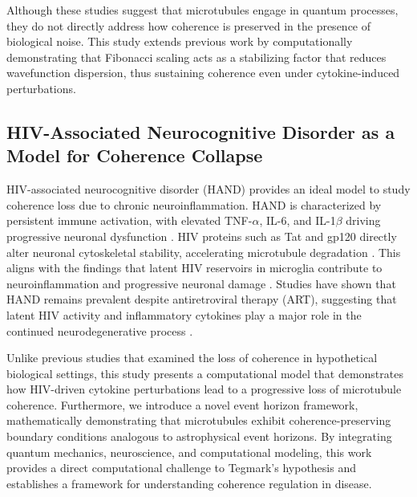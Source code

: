Although these studies suggest that microtubules engage in quantum processes, they do not directly address how coherence is preserved in the presence of biological noise. This study extends previous work by computationally demonstrating that Fibonacci scaling acts as a stabilizing factor that reduces wavefunction dispersion, thus sustaining coherence even under cytokine-induced perturbations.

\subsection{HIV-Associated Neurocognitive Disorder as a Model for Coherence Collapse}
HIV-associated neurocognitive disorder (HAND) provides an ideal model to study coherence loss due to chronic neuroinflammation. HAND is characterized by persistent immune activation, with elevated TNF-$\alpha$, IL-6, and IL-1$\beta$ driving progressive neuronal dysfunction \cite{zhou_development_2025}. HIV proteins such as Tat and gp120 directly alter neuronal cytoskeletal stability, accelerating microtubule degradation \cite{thompson_hiv-associated_2024}. This aligns with the findings that latent HIV reservoirs in microglia contribute to neuroinflammation and progressive neuronal damage \cite{sreeram_potential_2022}. Studies have shown that HAND remains prevalent despite antiretroviral therapy (ART), suggesting that latent HIV activity and inflammatory cytokines play a major role in the continued neurodegenerative process \cite{thompson_hiv-associated_2024}.

Unlike previous studies that examined the loss of coherence in hypothetical biological settings, this study presents a computational model that demonstrates how HIV-driven cytokine perturbations lead to a progressive loss of microtubule coherence. Furthermore, we introduce a novel event horizon framework, mathematically demonstrating that microtubules exhibit coherence-preserving boundary conditions analogous to astrophysical event horizons. By integrating quantum mechanics, neuroscience, and computational modeling, this work provides a direct computational challenge to Tegmark's hypothesis and establishes a framework for understanding coherence regulation in disease.

